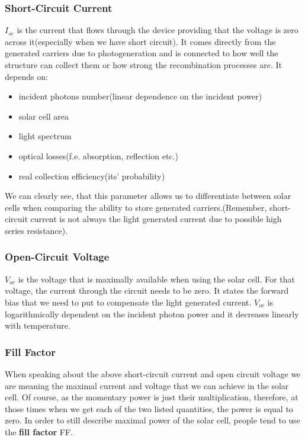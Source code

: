 \subsubsection{Short-Circuit Current}
$I_{sc}$ is the current that flows through the device providing that the voltage is zero across it(especially when we have short circuit). It comes directly from the generated carriers due to photogeneration and is connected to how well the structure can collect them or how strong the recombination processes are. It depends on:

\begin{itemize}
\item incident photons number(linear dependence on the incident power)
\item solar cell area
\item light spectrum
\item optical losses(f.e. absorption, reflection etc.)
\item real collection efficiency(its' probability)
\end{itemize}

We can clearly see, that this parameter allows us to differentiate between solar cells when comparing the ability to store generated carriers.(Remember, short-circuit current is not always the light generated current due to possible high series resistance).

\subsubsection{Open-Circuit Voltage}

$V_{oc}$ is the voltage that is maximally available when using the solar cell. For that voltage, the current through the circuit needs to be zero. It states the forward bias that we need to put to compensate the light generated current. $V_{oc}$ is logarithmically dependent on the incident photon power and it decreases linearly with temperature. 

\subsubsection{Fill Factor}

When speaking about the above short-circuit current and open circuit voltage we are meaning the maximal current and voltage that we can achieve in the solar cell. Of course, as the momentary power is just their multiplication, therefore, at those times when we get each of the two listed quantities, the power is equal to zero. In order to still describe maximal power of the solar cell, people tend to use the \textbf{fill factor} FF.

